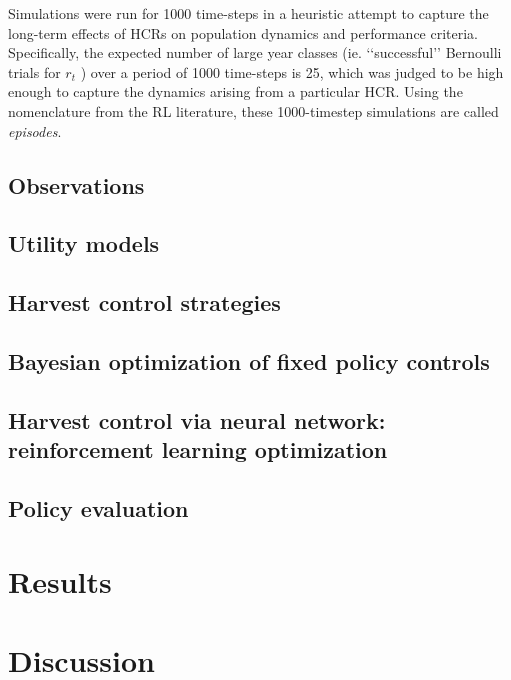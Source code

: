 \documentclass[floatfix,nofootinbib,longbibliography,notitlepage]{revtex4-1}
\begin{document}
Simulations were run for 1000 time-steps in a heuristic attempt to capture the long-term effects of HCRs on population dynamics and performance criteria. 
Specifically, the expected number of large year classes (ie. ‘‘successful’’ Bernoulli trials for $r_t$ ) over a period of 1000 time-steps is 25, which was judged to be high enough to capture the dynamics arising from a particular HCR. 
Using the nomenclature from the RL literature, these 1000-timestep simulations are called \emph{episodes}.

\subsection{Observations}

\subsection{Utility models}

\subsection{Harvest control strategies}

\subsection{Bayesian optimization of fixed policy controls}

\subsection{Harvest control via neural network: reinforcement learning optimization}

\subsection{Policy evaluation}


%
%
%
\section{Results}


%
%
%
\section{Discussion}




 

\end{document}
